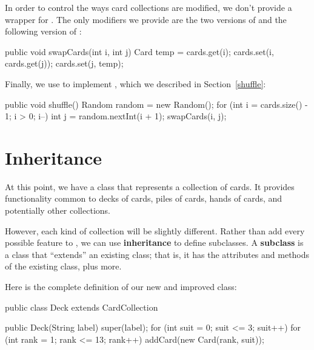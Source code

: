 
In order to control the ways card collections are modified, we don't provide a wrapper for .
The only modifiers we provide are the two versions of  and the following version of :

\begin{code}
public void swapCards(int i, int j) {
    Card temp = cards.get(i);
    cards.set(i, cards.get(j));
    cards.set(j, temp);
}
\end{code}

Finally, we use  to implement , which we described in Section~\ref{shuffle}:

\begin{code}
public void shuffle() {
    Random random = new Random();
    for (int i = cards.size() - 1; i > 0; i--) {
        int j = random.nextInt(i + 1);
        swapCards(i, j);
    }
}
\end{code}



\section{Inheritance}
\label{extending-classes_inheritance}

At this point, we have a class that represents a collection of cards.
It provides functionality common to decks of cards, piles of cards, hands of cards, and potentially other collections.


However, each kind of collection will be slightly different.
Rather than add every possible feature to , we can use {\bf inheritance} to define subclasses.
A {\bf subclass} is a class that ``extends'' an existing class; that is, it has the attributes and methods of the existing class, plus more.

Here is the complete definition of our new and improved  class:

\begin{code}
public class Deck extends CardCollection {

    public Deck(String label) {
        super(label);
        for (int suit = 0; suit <= 3; suit++) {
            for (int rank = 1; rank <= 13; rank++) {
                addCard(new Card(rank, suit));
            }
        }
    }
}
\end{code}

